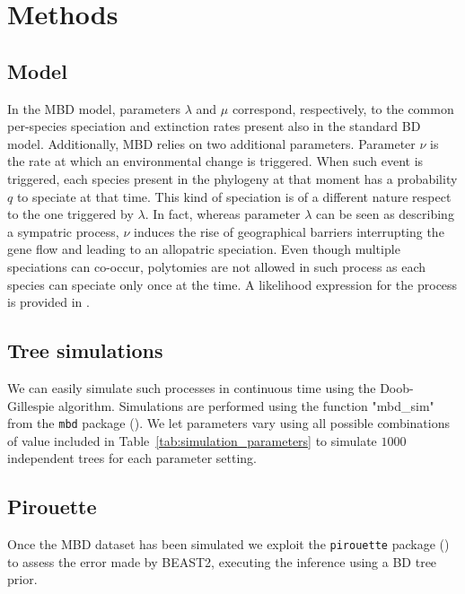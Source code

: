 \section{Methods}

\subsection{Model}

In the MBD model, parameters $\lambda$ and $\mu$ correspond, respectively, 
to the common per-species speciation and extinction rates present 
also in the standard BD model. 
Additionally, MBD relies on two additional parameters. 
Parameter $\nu$ is the rate at which an environmental change is triggered.
When such event is triggered, each species present in the phylogeny at that moment has a probability $q$ to speciate at that time.
This kind of speciation is of a different nature respect to the one triggered by $\lambda$. In fact, whereas parameter $\lambda$ can be seen as describing a sympatric process, $\nu$ induces the rise of geographical barriers interrupting the gene flow and leading to an allopatric speciation.
Even though multiple speciations can co-occur, polytomies are not allowed in such process as each species can speciate only once at the time.
A likelihood expression for the process is provided in \cite{mbd}.

\subsection{Tree simulations}

We can easily simulate such processes in continuous time using the Doob-Gillespie algorithm. Simulations are performed using the function "mbd\_sim" from the \verb;mbd; package (\citep{mbd}).
We let parameters vary using all possible combinations of value included in Table~\ref{tab:simulation_parameters} to simulate $1000$ independent trees for each parameter setting.



\subsection{Pirouette}

Once the MBD dataset has been simulated we exploit the \verb;pirouette; package (\citep{pirouette}) to assess the error made by BEAST2, executing  the inference using a BD tree prior.


